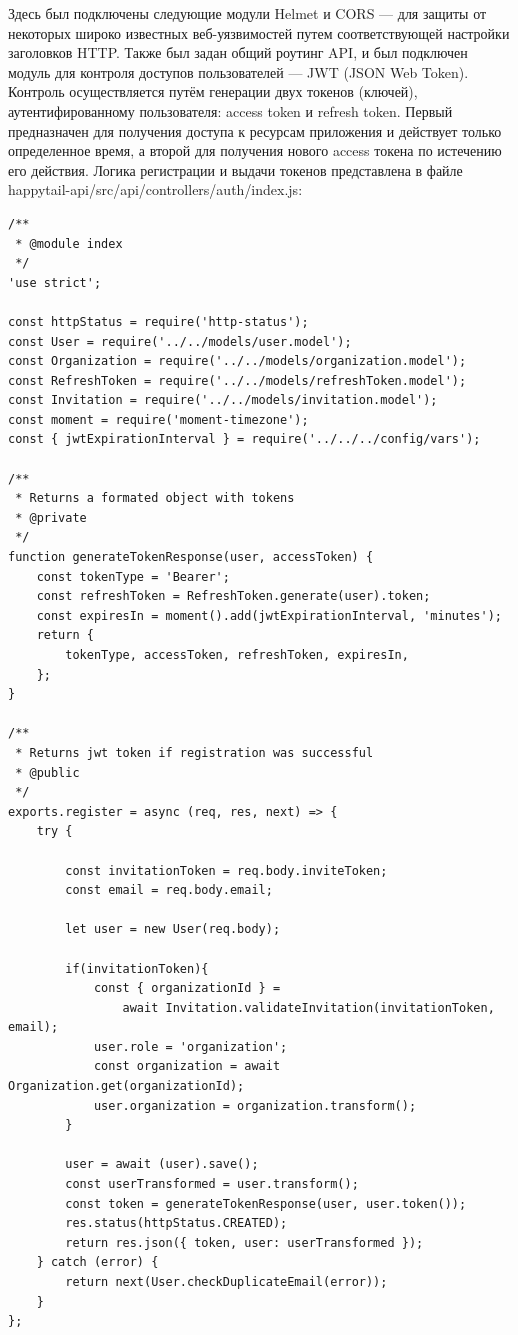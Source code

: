 \documentclass[12pt]{article}
\begin{document}
Здесь был подключены следующие модули Helmet и CORS --- для защиты от некоторых широко известных веб-уязвимостей путем соответствующей настройки заголовков HTTP. Также был задан общий роутинг API, и был подключен модуль для контроля доступов пользователей --- JWT (JSON Web Token). Контроль осуществляется путём генерации двух токенов (ключей), аутентифированному пользователя: access token и refresh token. Первый предназначен для получения доступа к ресурсам приложения и действует только определенное время, а второй для получения нового access токена по истечению его действия. Логика регистрации и выдачи токенов представлена в файле happytail-api/src/api/controllers/auth/index.js:

\footnotesize
\begin{verbatim}
/**
 * @module index
 */
'use strict';

const httpStatus = require('http-status');
const User = require('../../models/user.model');
const Organization = require('../../models/organization.model');
const RefreshToken = require('../../models/refreshToken.model');
const Invitation = require('../../models/invitation.model');
const moment = require('moment-timezone');
const { jwtExpirationInterval } = require('../../../config/vars');

/**
 * Returns a formated object with tokens
 * @private
 */
function generateTokenResponse(user, accessToken) {
    const tokenType = 'Bearer';
    const refreshToken = RefreshToken.generate(user).token;
    const expiresIn = moment().add(jwtExpirationInterval, 'minutes');
    return {
        tokenType, accessToken, refreshToken, expiresIn,
    };
}

/**
 * Returns jwt token if registration was successful
 * @public
 */
exports.register = async (req, res, next) => {
    try {

        const invitationToken = req.body.inviteToken;
        const email = req.body.email;

        let user = new User(req.body);

        if(invitationToken){
            const { organizationId } = 
            	await Invitation.validateInvitation(invitationToken, email);
            user.role = 'organization';
            const organization = await Organization.get(organizationId);
            user.organization = organization.transform();
        }

        user = await (user).save();
        const userTransformed = user.transform();
        const token = generateTokenResponse(user, user.token());
        res.status(httpStatus.CREATED);
        return res.json({ token, user: userTransformed });
    } catch (error) {
        return next(User.checkDuplicateEmail(error));
    }
};


\end{verbatim}
\end{document}
